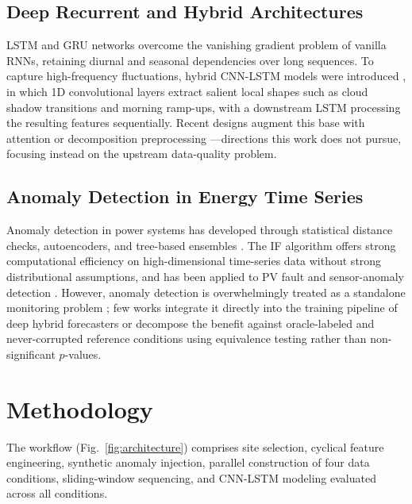 \documentclass[conference]{IEEEtran}
\begin{document}
\subsection{Deep Recurrent and Hybrid Architectures}
LSTM \cite{hochreiter1997lstm} and GRU networks overcome the vanishing gradient problem of vanilla RNNs, retaining diurnal and seasonal dependencies over long sequences. To capture high-frequency fluctuations, hybrid CNN-LSTM models were introduced \cite{zang2020cnnlstm, obiora2021hourly, qu2021dayahead, boucetta2024enhanced, zhou2024enhancing}, in which 1D convolutional layers extract salient local shapes such as cloud shadow transitions and morning ramp-ups, with a downstream LSTM processing the resulting features sequentially. Recent designs augment this base with attention \cite{qu2021dayahead, zhou2024enhancing} or decomposition preprocessing \cite{boucetta2024enhanced}---directions this work does not pursue, focusing instead on the upstream data-quality problem.

\subsection{Anomaly Detection in Energy Time Series}
Anomaly detection in power systems has developed through statistical distance checks, autoencoders, and tree-based ensembles \cite{zhang2021survey}. The IF algorithm \cite{liu2008isolation} offers strong computational efficiency on high-dimensional time-series data without strong distributional assumptions, and has been applied to PV fault and sensor-anomaly detection \cite{jorry2026unsupervised}. However, anomaly detection is overwhelmingly treated as a standalone monitoring problem \cite{zhang2021survey}; few works integrate it directly into the training pipeline of deep hybrid forecasters or decompose the benefit against oracle-labeled and never-corrupted reference conditions using equivalence testing rather than non-significant $p$-values.

\section{Methodology}

The workflow (Fig.~\ref{fig:architecture}) comprises site selection, cyclical feature engineering, synthetic anomaly injection, parallel construction of four data conditions, sliding-window sequencing, and CNN-LSTM modeling evaluated across all conditions.
\end{document}
